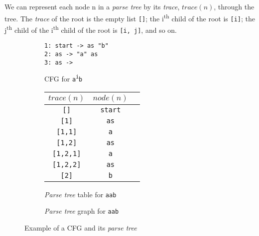 \begin{definition}
We can represent each node n in a \textit{parse tree} by its \textit{trace}, $trace(n)$, through the tree. The \textit{trace} of the root is the empty list \texttt{[]}; the i\textsuperscript{th} child of the root is \texttt{[i]}; the j\textsuperscript{th} child of the i\textsuperscript{th} child of the root is \texttt{[i, j]}, and so on.
\end{definition}

\begin{figure}[H]
\begin{subfigure}{0.3\textwidth}
\texttt{1: start -> as "b" \\ 2: as -> "a" as \\ 3: as ->\\}
\caption{CFG for \texttt{a\textsuperscript{i}b}}
\end{subfigure}
\begin{subfigure}{0.34\textwidth}
\centering
\begin{table}[H]
\begin{tabular}{@{}ccc@{}}
\toprule
\textbf{$trace(n)$} & \textbf{$node(n)$} \\ \midrule
\texttt{[]} & \texttt{start} \\
\texttt{[1]} & \texttt{as} \\
\texttt{[1,1]} & \texttt{a} \\
\texttt{[1,2]} & \texttt{as} \\
\texttt{[1,2,1]} & \texttt{a} \\
\texttt{[1,2,2]} & \texttt{as} \\
\texttt{[2]} & \texttt{b} \\ \bottomrule
\end{tabular}
\end{table}
\caption{\textit{Parse tree} table for \texttt{aab}}
\end{subfigure}
\begin{subfigure}{0.34\textwidth}
\centering
{}
\caption{\textit{Parse tree} graph for \texttt{aab}}
\end{subfigure}
\caption{Example of a CFG and its \textit{parse tree}}
\label{fig:cfg_parse_tree_example}
\end{figure}

